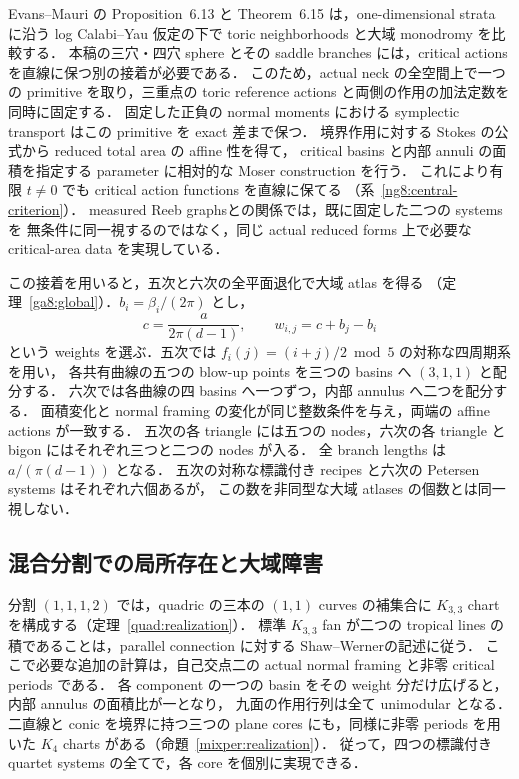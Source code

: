 Evans--Mauri の Proposition~6.13 と Theorem~6.15 は，one-dimensional strata に沿う
log Calabi--Yau 仮定の下で toric neighborhoods と大域 monodromy を比較する\cite{EM}．
本稿の三穴・四穴 sphere とその saddle branches には，critical actions を直線に保つ別の接着が必要である．
このため，actual neck の全空間上で一つの primitive を取り，三重点の toric reference actions
と両側の作用の加法定数を同時に固定する．
固定した正負の normal moments における symplectic transport はこの primitive を exact 差まで保つ．
境界作用に対する Stokes の公式から reduced total area の affine 性を得て，
critical basins と内部 annuli の面積を指定する parameter に相対的な Moser construction を行う．
これにより有限 $t\ne0$ でも critical action functions を直線に保てる
（系~\ref{ng8:central-criterion}）．
measured Reeb graphs\cite{DMT,IKM}との関係では，既に固定した二つの systems を
無条件に同一視するのではなく，同じ actual reduced forms 上で必要な critical-area data を実現している．

この接着を用いると，五次と六次の全平面退化で大域 atlas を得る
（定理~\ref{ga8:global}）．$b_i=\beta_i/(2\pi)$ とし，
\[
 c=\frac{a}{2\pi(d-1)},\qquad w_{i,j}=c+b_j-b_i
\]
という weights を選ぶ．五次では $f_i(j)=(i+j)/2\bmod5$ の対称な四周期系を用い，
各共有曲線の五つの blow-up points を三つの basins へ $(3,1,1)$ と配分する．
六次では各曲線の四 basins へ一つずつ，内部 annulus へ二つを配分する．
面積変化と normal framing の変化が同じ整数条件を与え，両端の affine actions が一致する．
五次の各 triangle には五つの nodes，六次の各 triangle と bigon にはそれぞれ三つと二つの nodes が入る．
全 branch lengths は $a/(\pi(d-1))$ となる．
五次の対称な標識付き recipes と六次の Petersen systems はそれぞれ六個あるが，
この数を非同型な大域 atlases の個数とは同一視しない．

\subsection{混合分割での局所存在と大域障害}

分割 $(1,1,1,2)$ では，quadric の三本の $(1,1)$ curves の補集合に
$K_{3,3}$ chart を構成する（定理~\ref{quad:realization}）．
標準 $K_{3,3}$ fan が二つの tropical lines の積であることは，parallel connection に対する
Shaw--Werner\cite[Theorem~7.2]{ShawWerner}の記述に従う．
ここで必要な追加の計算は，自己交点二の actual normal framing と非零 critical periods である．
各 component の一つの basin をその weight 分だけ広げると，内部 annulus の面積比が一となり，
九面の作用行列は全て unimodular となる．
二直線と conic を境界に持つ三つの plane cores にも，同様に非零 periods を用いた
$K_4$ charts がある（命題~\ref{mixper:realization}）．
従って，四つの標識付き quartet systems の全てで，各 core を個別に実現できる．

